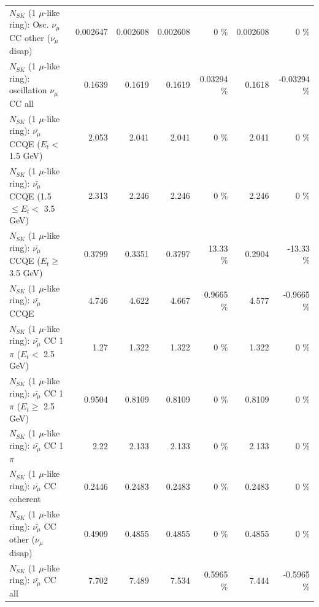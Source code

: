 \begin{table}
\begin{tabular}{| l | r | r | r  r | r  r |}
         $N_{SK}$ (1 $\mu$-like ring): Osc. $\nu_\mu$ CC other ($\nu_\mu$ disap) &        0.002647 &        0.002608 &        0.002608 &        0 \%  &        0.002608 &        0 \%  \\ 
                      $N_{SK}$ (1 $\mu$-like ring): oscillation $\nu_\mu$ CC all &          0.1639 &          0.1619 &          0.1619 &  0.03294 \%  &          0.1618 & -0.03294 \%  \\ 
\hline
\hline
          $N_{SK}$ (1 $\mu$-like ring): $\bar{\nu_\mu}$ CCQE ($E_{t} <$ 1.5 GeV) &           2.053 &           2.041 &           2.041 &        0 \%  &           2.041 &        0 \%  \\ 
 $N_{SK}$ (1 $\mu$-like ring): $\bar{\nu_\mu}$ CCQE (1.5 $\leq E_{t} <$ 3.5 GeV) &           2.313 &           2.246 &           2.246 &        0 \%  &           2.246 &        0 \%  \\ 
       $N_{SK}$ (1 $\mu$-like ring): $\bar{\nu_\mu}$ CCQE ($E_{t} \geq$ 3.5 GeV) &          0.3799 &          0.3351 &          0.3797 &    13.33 \%  &          0.2904 &   -13.33 \%  \\ 
\hline
                              $N_{SK}$ (1 $\mu$-like ring): $\bar{\nu_\mu}$ CCQE &           4.746 &           4.622 &           4.667 &   0.9665 \%  &           4.577 &  -0.9665 \%  \\ 
\hline
     $N_{SK}$ (1 $\mu$-like ring): $\bar{\nu_\mu}$ CC 1$\pi$ ($E_{t} <$ 2.5 GeV) &            1.27 &           1.322 &           1.322 &        0 \%  &           1.322 &        0 \%  \\ 
  $N_{SK}$ (1 $\mu$-like ring): $\bar{\nu_\mu}$ CC 1$\pi$ ($E_{t} \geq$ 2.5 GeV) &          0.9504 &          0.8109 &          0.8109 &        0 \%  &          0.8109 &        0 \%  \\ 
\hline
                         $N_{SK}$ (1 $\mu$-like ring): $\bar{\nu_\mu}$ CC 1$\pi$ &            2.22 &           2.133 &           2.133 &        0 \%  &           2.133 &        0 \%  \\ 
                       $N_{SK}$ (1 $\mu$-like ring): $\bar{\nu_\mu}$ CC coherent &          0.2446 &          0.2483 &          0.2483 &        0 \%  &          0.2483 &        0 \%  \\ 
        $N_{SK}$ (1 $\mu$-like ring): $\bar{\nu_\mu}$ CC other ($\nu_\mu$ disap) &          0.4909 &          0.4855 &          0.4855 &        0 \%  &          0.4855 &        0 \%  \\ 
                          $N_{SK}$ (1 $\mu$-like ring): $\bar{\nu_{\mu}}$ CC all &           7.702 &           7.489 &           7.534 &   0.5965 \%  &           7.444 &  -0.5965 \%  \\ 

\end{tabular}
\end{table}
